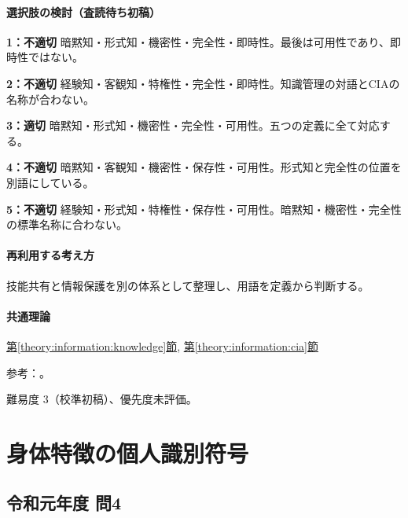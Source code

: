\paragraph{選択肢の検討（査読待ち初稿）}\mbox{}\par

\noindent\textbf{1：不適切} 暗黙知・形式知・機密性・完全性・即時性。最後は可用性であり、即時性ではない。\par

\noindent\textbf{2：不適切} 経験知・客観知・特権性・完全性・即時性。知識管理の対語とCIAの名称が合わない。\par

\noindent\textbf{3：適切} 暗黙知・形式知・機密性・完全性・可用性。五つの定義に全て対応する。\par

\noindent\textbf{4：不適切} 暗黙知・客観知・機密性・保存性・可用性。形式知と完全性の位置を別語にしている。\par

\noindent\textbf{5：不適切} 経験知・形式知・特権性・保存性・可用性。暗黙知・機密性・完全性の標準名称に合わない。\par

\paragraph{再利用する考え方} 技能共有と情報保護を別の体系として整理し、用語を定義から判断する。

\paragraph{共通理論} \hyperref[theory:information:knowledge]{第\ref*{theory:information:knowledge}節}, \hyperref[theory:information:cia]{第\ref*{theory:information:cia}節}

\par 参考：\cite{jaist_knowledge,iso27000_2009}。

\par 難易度 3（校準初稿）、優先度未評価。

\section{身体特徴の個人識別符号}

\subsection{令和元年度 問4}
\label{q:r01-reg-apt-04}

